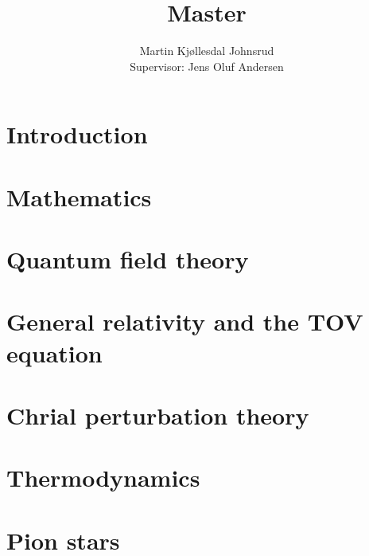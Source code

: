\documentclass{book}
\title{\huge{Master}}
\author{
    \large{Martin Kjøllesdal Johnsrud}\\
    \normalsize{Supervisor: Jens Oluf Andersen}
    }
\begin{document}
    \maketitle
    \listoftodos
    \clearpage
    \tableofcontents
   
    \setlength{\parindent}{0em}
    \setlength{\parskip}{0.8em}

    \chapter{Introduction}
    \label{chapter: introduction}
    


    \chapter{Mathematics}
    \label{chapter: math}
    
    

    \chapter{Quantum field theory}
    \label{chapter: QFT}
    
    
    
    
    

    \chapter{General relativity and the TOV equation}
    \label{chapter: GR}
    
    
    

    \chapter{Chrial perturbation theory}
    \label{chapter: chpt}
    
    
    

    \chapter{Thermodynamics}
    \label{chapter: thermodynamics}
    
    
    


    \chapter{Pion stars}
    \label{chapter: pion stars}
    
\end{document}
